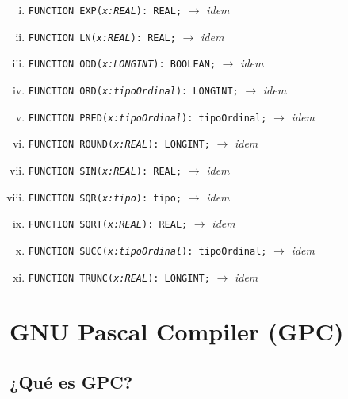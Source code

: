 \begin{enumerate}[I.]
\begin{enumerate}[i.]
\item \texttt{FUNCTION EXP(\textit{x:REAL}): REAL;} $\rightarrow$ \textit{idem}

\item \texttt{FUNCTION LN(\textit{x:REAL}): REAL;} $\rightarrow$ \textit{idem}

\item \texttt{FUNCTION ODD(\textit{x:LONGINT}): BOOLEAN;} $\rightarrow$ 
\textit{idem}

\item \texttt{FUNCTION ORD(\textit{x:tipoOrdinal}): LONGINT;} $\rightarrow$ 
\textit{idem}

\item \texttt{FUNCTION PRED(\textit{x:tipoOrdinal}): tipoOrdinal;} 
$\rightarrow$ \textit{idem}

\item \texttt{FUNCTION ROUND(\textit{x:REAL}): LONGINT;} $\rightarrow$ 
\textit{idem}

\item \texttt{FUNCTION SIN(\textit{x:REAL}): REAL;} $\rightarrow$ \textit{idem}

\item \texttt{FUNCTION SQR(\textit{x:tipo}): tipo;} $\rightarrow$ \textit{idem}

\item \texttt{FUNCTION SQRT(\textit{x:REAL}): REAL;} $\rightarrow$ \textit{idem}

\item \texttt{FUNCTION SUCC(\textit{x:tipoOrdinal}): tipoOrdinal;} 
$\rightarrow$ \textit{idem}

\item \texttt{FUNCTION TRUNC(\textit{x:REAL}): LONGINT;} $\rightarrow$ 
\textit{idem}

\end{enumerate}

\end{enumerate}



\section{GNU Pascal Compiler (GPC)}

%

\subsection{¿Qué es GPC?}

